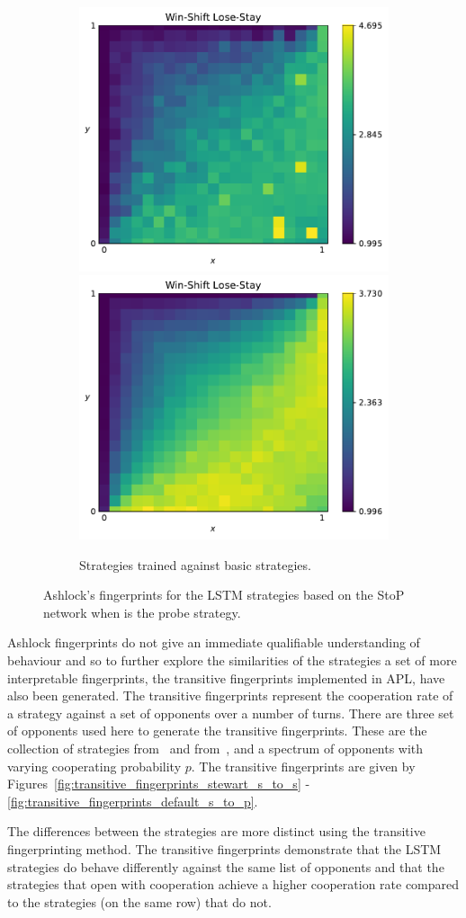 \begin{figure}[!htbp]
\begin{subfigure}{\textwidth}
        \includegraphics[width=.3\textwidth]{src/chapters/07/img/win_shift_lose_stay_basic_classification_1.pdf}
        \includegraphics[width=.3\textwidth]{src/chapters/07/img/win_shift_lose_stay_basic_classification_0_78.pdf}
        \caption{Strategies trained against basic strategies.}
    \end{subfigure}
    \caption{Ashlock's fingerprints for the LSTM strategies based on the StoP
    network when \Pavlov is the probe strategy.}\label{fig:ashlock_fingerprints_pavlov_s_to_p}
\end{figure}

Ashlock fingerprints do not give an immediate qualifiable understanding of behaviour and so
to further explore the similarities of the strategies a set of more
interpretable fingerprints, the transitive fingerprints implemented in APL, have
also been generated. The transitive fingerprints represent the cooperation rate
of a strategy against a set of opponents over a number of turns. There are three
set of opponents used here to generate the transitive fingerprints. These are
the collection of strategies from~\cite{Stewart2012} and
from~\cite{Beaufils1997}, and a spectrum of \Random opponents with varying cooperating
probability \(p\). The transitive fingerprints are given by
Figures~\ref{fig:transitive_fingerprints_stewart_s_to_s}
-\ref{fig:transitive_fingerprints_default_s_to_p}.

The differences between the strategies are more distinct using the transitive
fingerprinting method. The transitive fingerprints demonstrate that the LSTM
strategies do behave differently against the same list of opponents and
that the strategies that open with cooperation achieve a higher cooperation rate
compared to the strategies (on the same row) that do not.

